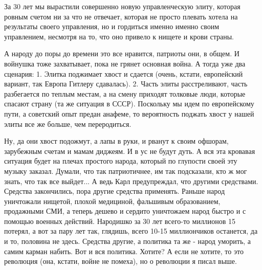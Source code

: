 За 30 лет мы вырастили совершенно новую управленческую элиту, которая ровным
счетом ни за что не отвечает, которая не просто плевать хотела на результаты
своего управления, но и гордиться именно именно своим управлением, несмотря на
то, что оно привело к нищете и крови страны.

А народу до поры до времени это все нравится, патриоты они, в общем. И войнушка
тоже захватывает, пока не грянет основная война. А тогда уже два сценария: 1.
Элитка поджимает хвост и сдается (очень, кстати, европейский вариант, так
Европа Гитлеру сдавалась). 2. Часть элиты расстреливают, часть разбегается по
теплым местам, а на смену приходят толковые люди, которые спасают страну (та же
ситуация в СССР). Поскольку мы идем по европейскому пути, а советский опыт
предан анафеме, то вероятность поджать хвост у нашей элиты все же больше, чем
переродиться. 

Ну, да они хвост подожмут, а лапы в руки, и рванут к своим офшорам, зарубежным
счетам и мамам диджеям. И в ус не будут дуть. А вся эта кровавая ситуация будет
на плечах простого народа, который по глупости своей эту музыку заказал.
Думали, что так патриотичнее, им так подсказали, кто ж мог знать, что так все
выйдет... А ведь Карл предупреждал, что другими средствами. Средства
закончились, пора другие средства применять. Раньше народ уничтожали нищетой,
плохой медициной, фальшивым образованием, продажными СМИ, а теперь дешево и
сердито уничтожаем народ быстро и с помощью военных действий. Народишко за 30
лет всего-то миллионов 15 потерял, а вот за пару лет так, глядишь, всего 10-15
миллиончиков останется, да и то, половина не здесь. Средства другие, а политика
та же - народ уморить, а самим карман набить. Вот и вся политика. Хотите? А
если не хотите, то это революция (она, кстати, войне не помеха), но о революции
я писал выше.

